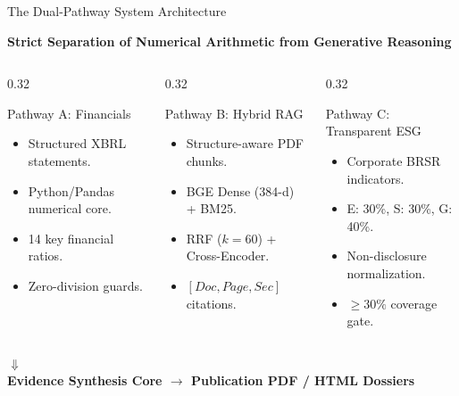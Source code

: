 \documentclass[aspectratio=169,10pt]{beamer}
\begin{document}
\begin{frame}{The Dual-Pathway System Architecture}
\begin{center}
\textbf{Strict Separation of Numerical Arithmetic from Generative Reasoning}
\end{center}
\vspace{0.2cm}
\begin{columns}[T]
\begin{column}{0.32\textwidth}
\begin{exampleblock}{Pathway A: Financials}
\begin{itemize}
    \item Structured XBRL statements.
    \item Python/Pandas numerical core.
    \item 14 key financial ratios.
    \item Zero-division guards.
\end{itemize}
\end{exampleblock}
\end{column}
\begin{column}{0.32\textwidth}
\begin{alertblock}{Pathway B: Hybrid RAG}
\begin{itemize}
    \item Structure-aware PDF chunks.
    \item BGE Dense (384-d) + BM25.
    \item RRF ($k=60$) + Cross-Encoder.
    \item $[Doc, Page, Sec]$ citations.
\end{itemize}
\end{alertblock}
\end{column}
\begin{column}{0.32\textwidth}
\begin{block}{Pathway C: Transparent ESG}
\begin{itemize}
    \item Corporate BRSR indicators.
    \item E: 30\%, S: 30\%, G: 40\%.
    \item Non-disclosure normalization.
    \item $\ge 30\%$ coverage gate.
\end{itemize}
\end{block}
\end{column}
\end{columns}
\vspace{0.3cm}
\begin{center}
$\Downarrow$ \\
\textbf{Evidence Synthesis Core $\longrightarrow$ Publication PDF / HTML Dossiers}
\end{center}
\end{frame}
\end{document}
